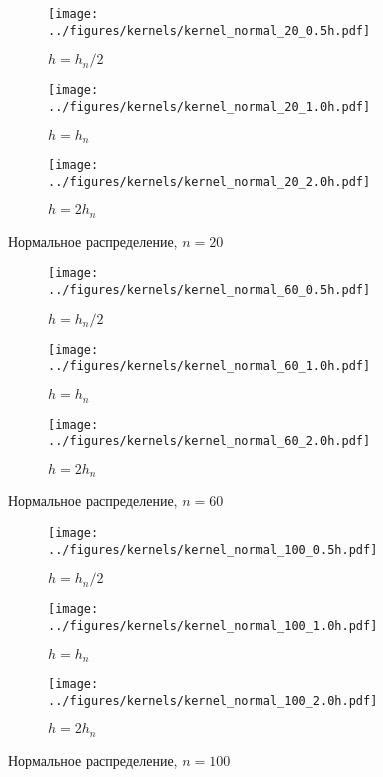 \documentclass[12pt]{article}
\begin{document}
	\begin{figure}[H]
		\centering
		\begin{subfigure}[t]{.3\linewidth}
			\centering\texttt{[image: ../figures/kernels/kernel\_normal\_20\_0.5h.pdf]}
			\caption*{$h = h_n/2$}
		\end{subfigure}
		\begin{subfigure}[t]{.3\linewidth}
			\centering\texttt{[image: ../figures/kernels/kernel\_normal\_20\_1.0h.pdf]}
			\caption*{$h = h_n$}
		\end{subfigure}
		\begin{subfigure}[t]{.3\linewidth}
			\centering\texttt{[image: ../figures/kernels/kernel\_normal\_20\_2.0h.pdf]}
			\caption*{$h = 2h_n$}
		\end{subfigure}
		\caption{Нормальное распределение, $n = 20$}
	\end{figure}
	\begin{figure}[H]
		\centering
		\begin{subfigure}[t]{.3\linewidth}
			\centering\texttt{[image: ../figures/kernels/kernel\_normal\_60\_0.5h.pdf]}
			\caption*{$h = h_n/2$}
		\end{subfigure}
		\begin{subfigure}[t]{.3\linewidth}
			\centering\texttt{[image: ../figures/kernels/kernel\_normal\_60\_1.0h.pdf]}
			\caption*{$h = h_n$}
		\end{subfigure}
		\begin{subfigure}[t]{.3\linewidth}
			\centering\texttt{[image: ../figures/kernels/kernel\_normal\_60\_2.0h.pdf]}
			\caption*{$h = 2h_n$}
		\end{subfigure}
		\caption{Нормальное распределение, $n = 60$}
	\end{figure}
	\begin{figure}[H]
		\centering
		\begin{subfigure}[t]{.3\linewidth}
			\centering\texttt{[image: ../figures/kernels/kernel\_normal\_100\_0.5h.pdf]}
			\caption*{$h = h_n/2$}
		\end{subfigure}
		\begin{subfigure}[t]{.3\linewidth}
			\centering\texttt{[image: ../figures/kernels/kernel\_normal\_100\_1.0h.pdf]}
			\caption*{$h = h_n$}
		\end{subfigure}
		\begin{subfigure}[t]{.3\linewidth}
			\centering\texttt{[image: ../figures/kernels/kernel\_normal\_100\_2.0h.pdf]}
			\caption*{$h = 2h_n$}
		\end{subfigure}
		\caption{Нормальное распределение, $n = 100$}
	\end{figure}
\end{document}
